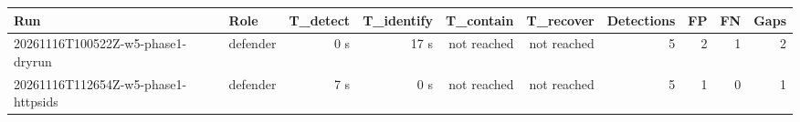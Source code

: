 \begin{tabular}{llrrrrrrrr}
\toprule
Run & Role & T\_detect & T\_identify & T\_contain & T\_recover & Detections & FP & FN & Gaps \\
\midrule
20261116T100522Z-w5-phase1-dryrun & defender & 0 s & 17 s & not reached & not reached & 5 & 2 & 1 & 2 \\
20261116T112654Z-w5-phase1-httpsids & defender & 7 s & 0 s & not reached & not reached & 5 & 1 & 0 & 1 \\
\bottomrule
\end{tabular}
